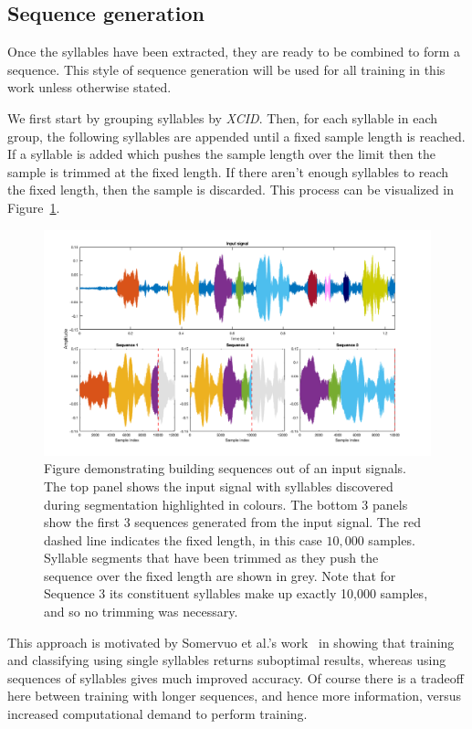 \subsection{Sequence generation}\label{ssec:sequence_gen}

Once the syllables have been extracted, they are ready to be combined to form a
sequence. This style of sequence generation will be used for all training in
this work unless otherwise stated.

We first start by grouping syllables by \textit{XCID}. Then, for each syllable
in each group, the following syllables are appended until a fixed sample length
is reached. If a syllable is added which pushes the sample length over the
limit then the sample is trimmed at the fixed length. If there aren't enough
syllables to reach the fixed length, then the sample is discarded. This process
can be visualized in Figure~\ref{fig:sequence_building}.

\begin{figure}[ht]
  \centering
  \includegraphics[width=\textwidth]{figures/sequence_building.png}
  \caption{Figure demonstrating building sequences out of an input signals. The
    top panel shows the input signal with syllables discovered during
    segmentation highlighted in colours. The bottom 3 panels show the first 3
    sequences generated from the input signal. The red dashed line indicates the
    fixed length, in this case $10,000$ samples. Syllable segments that have
    been trimmed as they push the sequence over the fixed length are shown in
    grey. Note that for Sequence 3 its constituent syllables make up exactly
    10,000 samples, and so no trimming was
  necessary.}\label{fig:sequence_building}
\end{figure}

This approach is motivated by Somervuo et al.'s
work~\cite{somervuo2006parametric} in showing that training and classifying
using single syllables returns suboptimal results, whereas using sequences of
syllables gives much improved accuracy. Of course there is a tradeoff here
between training with longer sequences, and hence more information, versus
increased computational demand to perform training.

